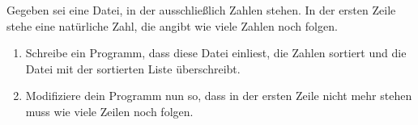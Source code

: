 \begin{aufg}
Gegeben sei eine Datei, in der ausschließlich Zahlen stehen. In der ersten Zeile stehe eine natürliche Zahl, die angibt wie viele Zahlen noch folgen. 
\begin{enumerate}
  \item Schreibe ein Programm, dass diese Datei einliest, die Zahlen sortiert und die Datei mit der sortierten Liste überschreibt. 
  \item Modifiziere dein Programm nun so, dass in der ersten Zeile nicht mehr stehen muss wie viele Zeilen noch folgen.
\end{enumerate}
\end{aufg}